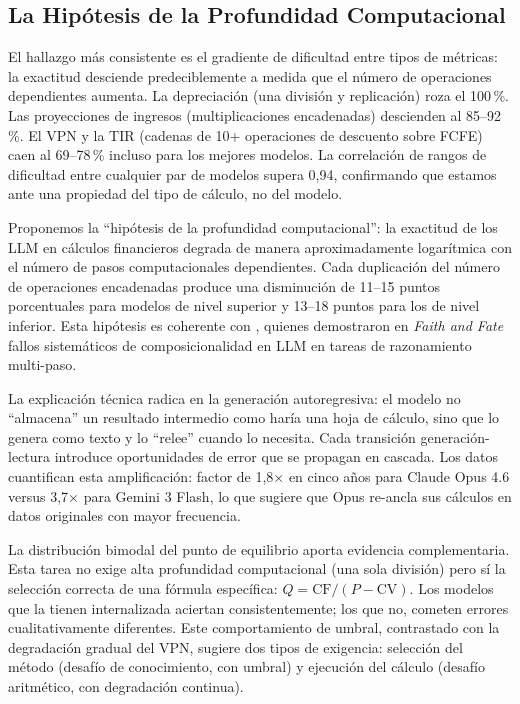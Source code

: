 \documentclass[12pt,a4paper]{article}
\begin{document}
\subsection{La Hipótesis de la Profundidad Computacional}

El hallazgo más consistente es el gradiente de dificultad entre tipos de métricas: la exactitud desciende predeciblemente a medida que el número de operaciones dependientes aumenta. La depreciación (una división y replicación) roza el 100\,\%. Las proyecciones de ingresos (multiplicaciones encadenadas) descienden al 85--92\,\%. El VPN y la TIR (cadenas de 10+ operaciones de descuento sobre FCFE) caen al 69--78\,\% incluso para los mejores modelos. La correlación de rangos de dificultad entre cualquier par de modelos supera 0,94, confirmando que estamos ante una propiedad del tipo de cálculo, no del modelo.

Proponemos la ``hipótesis de la profundidad computacional'': la exactitud de los LLM en cálculos financieros degrada de manera aproximadamente logarítmica con el número de pasos computacionales dependientes. Cada duplicación del número de operaciones encadenadas produce una disminución de 11--15 puntos porcentuales para modelos de nivel superior y 13--18 puntos para los de nivel inferior. Esta hipótesis es coherente con \citet{Dziri2023}, quienes demostraron en \textit{Faith and Fate} fallos sistemáticos de composicionalidad en LLM en tareas de razonamiento multi-paso.

La explicación técnica radica en la generación autoregresiva: el modelo no ``almacena'' un resultado intermedio como haría una hoja de cálculo, sino que lo genera como texto y lo ``relee'' cuando lo necesita. Cada transición generación-lectura introduce oportunidades de error que se propagan en cascada. Los datos cuantifican esta amplificación: factor de 1,8× en cinco años para Claude Opus 4.6 versus 3,7× para Gemini 3 Flash, lo que sugiere que Opus re-ancla sus cálculos en datos originales con mayor frecuencia.

La distribución bimodal del punto de equilibrio aporta evidencia complementaria. Esta tarea no exige alta profundidad computacional (una sola división) pero sí la selección correcta de una fórmula específica: $Q = \text{CF} / (P - \text{CV})$. Los modelos que la tienen internalizada aciertan consistentemente; los que no, cometen errores cualitativamente diferentes. Este comportamiento de umbral, contrastado con la degradación gradual del VPN, sugiere dos tipos de exigencia: selección del método (desafío de conocimiento, con umbral) y ejecución del cálculo (desafío aritmético, con degradación continua).
\end{document}
